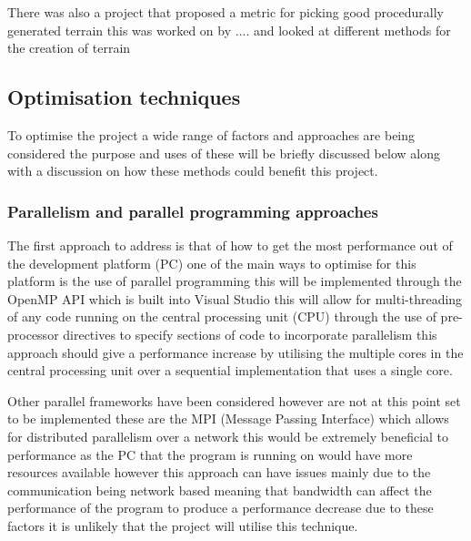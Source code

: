 There was also a project that proposed a metric for picking good procedurally generated terrain this was worked on by .... and looked at different methods for the creation of terrain 

\subsection{Optimisation techniques}
To optimise the project a wide range of factors and approaches are being considered the purpose and uses of these will be briefly discussed below along with a discussion on how these methods could benefit this project.\\

\subsubsection{Parallelism and parallel programming approaches}
The first approach to address is that of how to get the most performance out of the development platform (PC) one of the main ways to optimise for this platform is the use of parallel programming this will be implemented through the OpenMP API \cite{Openmp}which is built into Visual Studio this will allow for multi-threading of any code running on the central processing unit (CPU) through the use of pre-processor directives to specify sections of code to incorporate parallelism this approach should give a performance increase by utilising the multiple cores in the central processing unit over a sequential implementation that uses a single core.

Other parallel frameworks have been considered however are not at this point set to be implemented these are the MPI (Message Passing Interface)\cite{mpi} which allows for distributed parallelism over a network this would be extremely beneficial to performance as the PC that the program is running on would have more resources available however this approach can have issues mainly due to the communication being network based meaning that bandwidth can affect the performance of the program to produce a performance decrease due to these factors it is unlikely that the project will utilise this technique. 

